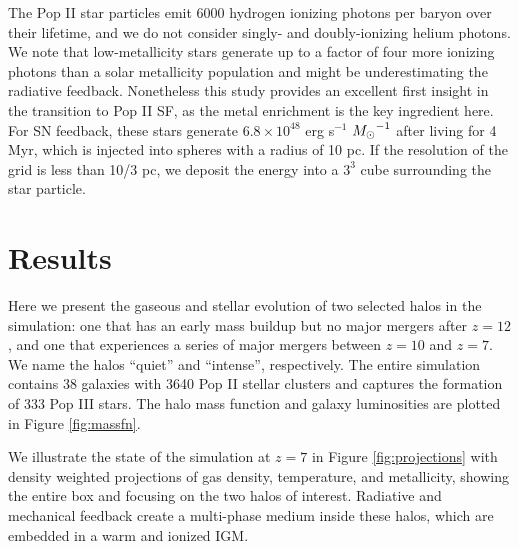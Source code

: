 \documentclass[apjl]{emulateapj}
\newcommand{\Ms}{\ifmmode{M_\odot}\else{$M_\odot$}\fi}
\begin{document}
The Pop II star particles emit 6000 hydrogen ionizing photons per
baryon over their lifetime, and we do not consider singly- and
doubly-ionizing helium photons.  We note that low-metallicity stars
generate up to a factor of four more ionizing photons than a solar
metallicity population \citep{Schaerer03} and might be underestimating
the radiative feedback.  Nonetheless this study provides an excellent
first insight in the transition to Pop II SF, as the metal enrichment
is the key ingredient here.  For SN feedback, these stars generate
$6.8 \times 10^{48}$ erg s$^{-1}$ $\Ms^{-1}$ after living for 4 Myr,
which is injected into spheres with a radius of 10 pc.  If the
resolution of the grid is less than 10/3 pc, we deposit the energy
into a $3^3$ cube surrounding the star particle.

\begin{figure*}
\caption{\label{fig:evo} (a) Evolution of the total halo mass (top),
  stellar mass (middle), and gas fraction (bottom) of the quiet
  (dashed) and intense (solid) halos.  (b) Mass-weighted stellar
  metallicities and gas metallicities enriched by Pop II and Pop III
  SNe of the intense (top) and quiet (bottom) halos.}
\end{figure*}

\section{Results}
\label{sec:results}

Here we present the gaseous and stellar evolution of two selected
halos in the simulation: one that has an early mass buildup but no
major mergers after $z=12$, and one that experiences a series of major
mergers between $z=10$ and $z=7$.  We name the halos ``quiet'' and
``intense'', respectively.  The entire simulation contains 38 galaxies
with 3640 Pop II stellar clusters and captures the formation of 333
Pop III stars.  The halo mass function and galaxy luminosities are
plotted in Figure \ref{fig:massfn}.


We illustrate the state of the simulation at $z=7$ in Figure
\ref{fig:projections} with density weighted projections of gas
density, temperature, and metallicity, showing the entire box and
focusing on the two halos of interest.  Radiative and mechanical
feedback create a multi-phase medium inside these halos, which are
embedded in a warm and ionized IGM.
\end{document}
